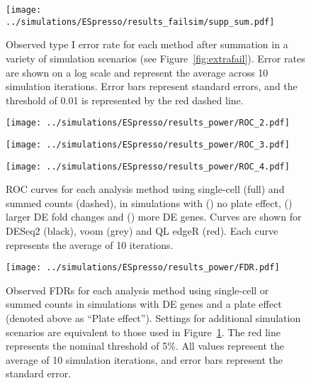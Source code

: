 \documentclass{article}
\begin{document}
\begin{figure}[p]
    \begin{center}
        \texttt{[image: ../simulations/ESpresso/results\_failsim/supp\_sum.pdf]}
    \end{center}
    \caption{   
        Observed type I error rate for each method after summation in a variety of simulation scenarios (see Figure~\ref{fig:extrafail}).
        Error rates are shown on a log scale and represent the average across 10 simulation iterations.
        Error bars represent standard errors, and the threshold of 0.01 is represented by the red dashed line.
    }
\end{figure}

\begin{figure}[p]
    \begin{center}
    \begin{minipage}{0.32\textwidth}
        \texttt{[image: ../simulations/ESpresso/results\_power/ROC\_2.pdf]}
        \subcaption[]{}
        \label{subfig:noplate}
    \end{minipage}
    \begin{minipage}{0.32\textwidth}
        \texttt{[image: ../simulations/ESpresso/results\_power/ROC\_3.pdf]}
        \subcaption[]{}
        \label{subfig:bigfc}
    \end{minipage}
    \begin{minipage}{0.32\textwidth}
        \texttt{[image: ../simulations/ESpresso/results\_power/ROC\_4.pdf]}
        \subcaption[]{}
        \label{subfig:morede}
    \end{minipage}
    \end{center}
    \caption{  
        ROC curves for each analysis method using single-cell (full) and summed counts (dashed), in simulations with () no plate effect, () larger DE fold changes and () more DE genes. 
        Curves are shown for DESeq2 (black), voom (grey) and QL edgeR (red).
        Each curve represents the average of 10 iterations.
    }
    \label{fig:altroc}
\end{figure}

\begin{figure}[p]
    \begin{center}
        \texttt{[image: ../simulations/ESpresso/results\_power/FDR.pdf]}
    \end{center}
    \caption{
        Observed FDRs for each analysis method using single-cell or summed counts in simulations with DE genes and a plate effect (denoted above as ``Plate effect'').
        Settings for additional simulation scenarios are equivalent to those used in Figure~\ref{fig:altroc}.
        The red line represents the nominal threshold of 5\%.
        All values represent the average of 10 simulation iterations, and error bars represent the standard error.
    }
\end{figure}
\end{document}
